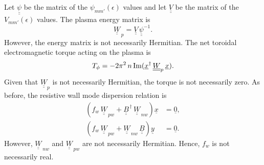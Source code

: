 \documentclass[12pt,prb,aps,notitlepage]{revtex4-1}
\begin{document}
Let $\underline{\underline{\psi}}$ be the matrix of the $\psi_{mm'}(\epsilon)$ values and let $\underline{\underline{V}}$ be the matrix of the
$V_{mm'}(\epsilon)$ values. The plasma energy matrix is
\begin{equation}
\underline{\underline{W}}_{\,p} = \underline{\underline{V}}\,\underline{\underline{\psi}}^{-1}.
\end{equation}
However, the energy matrix is not necessarily  Hermitian. The net toroidal electromagnetic torque acting on the plasma is
\begin{equation}
T_\phi = -2\pi^2\,n\,{\rm Im}(\underline{x}^\dag\,\underline{\underline{W}}_p\,\underline{x}).
\end{equation}
Given that $\underline{\underline{W}}_p$ is not necessarily Hermitian, the torque is not necessarily zero. 
As before, the resistive wall mode dispersion relation is 
\begin{align}
\left(f_w\,\underline{\underline{W}}_{\,pw}
+\underline{\underline{B}}^{\,\dag}\,\underline{\underline{W}}_{\,nw}\right)\underline{x}&=\underline{0},\\[0.5ex]
\left(f_w\,\underline{\underline{W}}_{\,pw}
+\underline{\underline{W}}_{\,nw}\,\underline{\underline{B}}\right)\underline{y} &=\underline{0}.
\end{align}
However, $\underline{\underline{W}}_{\,nw}$ and $\underline{\underline{W}}_{\,pw}$ are not necessarily  Hermitian. Hence, $f_w$ is not necessarily real. 
\end{document}
